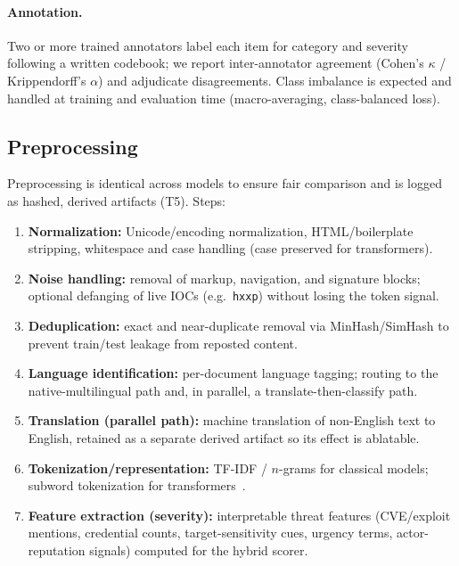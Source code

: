\documentclass[11pt,a4paper]{article}
\begin{document}
\paragraph{Annotation.} Two or more trained annotators label each item for category and
severity following a written codebook; we report inter-annotator agreement (Cohen's
$\kappa$ / Krippendorff's $\alpha$) and adjudicate disagreements. Class imbalance is
expected and handled at training and evaluation time (macro-averaging,
class-balanced loss).

\subsection{Preprocessing}\label{sec:method-prep}
Preprocessing is identical across models to ensure fair comparison and is logged as
hashed, derived artifacts (T5). Steps:
\begin{enumerate}[leftmargin=1.5em,itemsep=1pt]
  \item \textbf{Normalization:} Unicode/encoding normalization, HTML/boilerplate
  stripping, whitespace and case handling (case preserved for transformers).
  \item \textbf{Noise handling:} removal of markup, navigation, and signature blocks;
  optional defanging of live IOCs (e.g.\ \texttt{hxxp}) without losing the token signal.
  \item \textbf{Deduplication:} exact and near-duplicate removal via MinHash/SimHash to
  prevent train/test leakage from reposted content.
  \item \textbf{Language identification:} per-document language tagging; routing to the
  native-multilingual path and, in parallel, a translate-then-classify path.
  \item \textbf{Translation (parallel path):} machine translation of non-English text to
  English, retained as a separate derived artifact so its effect is ablatable.
  \item \textbf{Tokenization/representation:} TF-IDF / $n$-grams for classical models;
  subword tokenization for transformers~\cite{devlin2019bert,conneau2020xlmr}.
  \item \textbf{Feature extraction (severity):} interpretable threat features
  (CVE/exploit mentions, credential counts, target-sensitivity cues, urgency terms,
  actor-reputation signals) computed for the hybrid scorer.
\end{enumerate}
\end{document}
